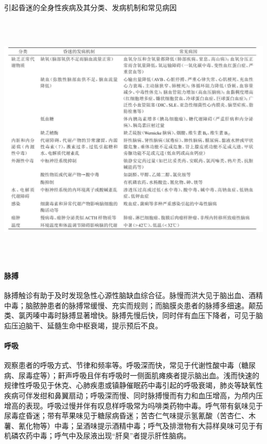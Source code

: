 \begin{table}[htbp]
\centering
\caption{引起昏迷的全身性疾病及其分类、发病机制和常见病因}
\label{tab2-2}
\includegraphics[width=6.73958in,height=4.83333in]{./images/Image00005.jpg}
\end{table}

\paragraph{脉搏}

脉搏触诊有助于及时发现急性心源性脑缺血综合征。脉慢而洪大见于脑出血、酒精中毒；脑脓肿患者的脉搏常缓慢、充实而规则；而脑膜炎患者的脉搏多细速。颠茄类、氯丙嗪中毒时脉搏显著增快。脉搏先慢后快，同时伴有血压下降者，可见于脑疝压迫脑干、延髓生命中枢衰竭，提示预后不良。

\paragraph{呼吸}

观察患者的呼吸方式、节律和频率等。呼吸深而快，常见于代谢性酸中毒（糖尿病、尿毒症等）；鼾声呼吸且伴有呼吸时一侧面肌瘫痪者提示脑出血。浅而快速的规律性呼吸见于休克、心肺疾患或镇静催眠药中毒引起的呼吸衰竭，肺炎等缺氧性疾病可伴发绀和鼻翼扇动；呼吸深而慢、同时脉搏慢而有力和血压增高，为颅内压增高的表现。呼吸过慢并伴有叹息样呼吸常为吗啡类药物中毒。呼气带有氨味见于尿毒症昏迷；带有苹果味见于糖尿病昏迷；苦杏仁气味提示氢氰酸（苦杏仁、木薯、氰化物等）中毒；呈酒味提示酒精中毒；呼气及排泄物有大蒜样臭味可见于有机磷农药中毒；呼气中及尿液出现“肝臭”者提示肝性脑病。

